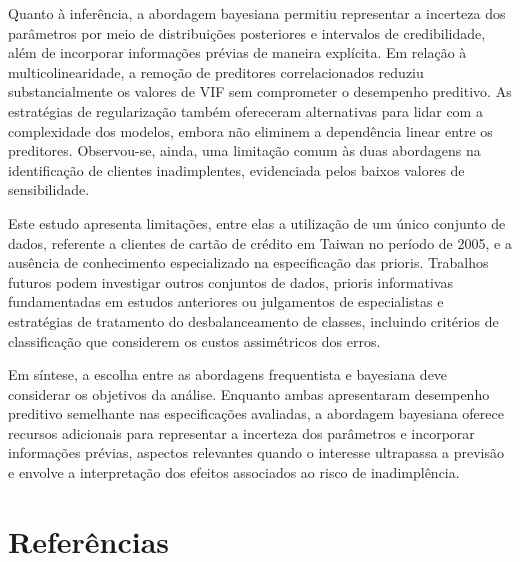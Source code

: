 \documentclass[
  brazilian,
  12pt,
  letterpaper,
  DIV=11,
  numbers=noendperiod]{scrartcl}
\begin{document}
Quanto à inferência, a abordagem bayesiana permitiu representar a
incerteza dos parâmetros por meio de distribuições posteriores e
intervalos de credibilidade, além de incorporar informações prévias de
maneira explícita. Em relação à multicolinearidade, a remoção de
preditores correlacionados reduziu substancialmente os valores de VIF
sem comprometer o desempenho preditivo. As estratégias de regularização
também ofereceram alternativas para lidar com a complexidade dos
modelos, embora não eliminem a dependência linear entre os preditores.
Observou-se, ainda, uma limitação comum às duas abordagens na
identificação de clientes inadimplentes, evidenciada pelos baixos
valores de sensibilidade.

Este estudo apresenta limitações, entre elas a utilização de um único
conjunto de dados, referente a clientes de cartão de crédito em Taiwan
no período de 2005, e a ausência de conhecimento especializado na
especificação das prioris. Trabalhos futuros podem investigar outros
conjuntos de dados, prioris informativas fundamentadas em estudos
anteriores ou julgamentos de especialistas e estratégias de tratamento
do desbalanceamento de classes, incluindo critérios de classificação que
considerem os custos assimétricos dos erros.

Em síntese, a escolha entre as abordagens frequentista e bayesiana deve
considerar os objetivos da análise. Enquanto ambas apresentaram
desempenho preditivo semelhante nas especificações avaliadas, a
abordagem bayesiana oferece recursos adicionais para representar a
incerteza dos parâmetros e incorporar informações prévias, aspectos
relevantes quando o interesse ultrapassa a previsão e envolve a
interpretação dos efeitos associados ao risco de inadimplência.

\section*{Referências}\label{referuxeancias}
\end{document}
